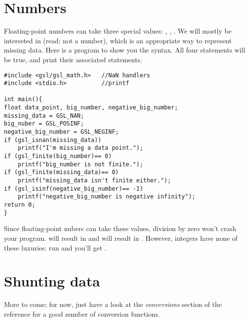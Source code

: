 \section{Numbers}      
Floating-point numbers can take three special values: , , . We will mostly be
interested in  (read: not a number), which is an appropriate way to represent missing data. Here is a
program to show you the syntax. All four  statements will be true, and print their associated
statements.
\begin{lstlisting}
#include <gsl/gsl_math.h>   //NaN handlers
#include <stdio.h>          //printf

int main(){
float data_point, big_number, negative_big_number;
missing_data = GSL_NAN;
big_nuber = GSL_POSINF;
negative_big_number = GSL_NEGINF;
if (gsl_isnan(missing_data))
    printf("I'm missing a data point.");
if (gsl_finite(big_number)== 0)
    printf("big_number is not finite.");
if (gsl_finite(missing_data)== 0)
    printf("missing_data isn't finite either.");
if (gsl_isinf(negative_big_number)== -1)
    printf("negative_big_number is negative infinity");
return 0;
}
\end{lstlisting}
Since floating-point nubers can take these values, division by zero
won't crash your program.  will result in
 and  will result in . However, integers have none of these luxuries: run  and you'll get .


\section{Shunting data} \label{asst_conversions}  

More to come; for now, just have a look at the {\sl conversions} section
of the reference for a good number of conversion functions.

